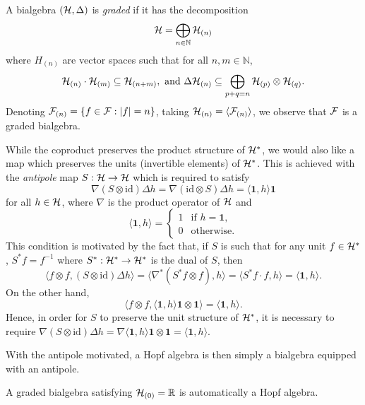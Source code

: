 \documentclass[11pt]{style/preprint}
\begin{document}
A bialgebra \(({\mathcal H}, \Delta)\) is \textit{graded} if it has the decomposition 
\[{\mathcal H} = \bigoplus_{n \in \mathbb{N}} {\mathcal H}_{(n)}\]
where \(H_{(n)}\) are vector spaces such that for all \(n, m \in \mathbb{N}\),
\[{\mathcal H}_{(n)} \cdot {\mathcal H}_{(m)} \subseteq {\mathcal H}_{(n + m)}, \text{ and } 
  \Delta {\mathcal H}_{(n)} \subseteq \bigoplus_{p + q = n} {\mathcal H}_{(p)} \otimes {\mathcal H}_{(q)}.\]
Denoting \({\mathcal F}_{(n)} = \{f \in {\mathcal F} : |f| = n\}\), taking \({\mathcal H}_{(n)} = \langle {\mathcal F}_{(n)}\rangle\), 
we observe that \({\mathcal F}\) is a graded bialgebra. 

While the coproduct preserves the product structure of \({\mathcal H}^*\), we would also like a map which 
preserves the units (invertible elements) of \({\mathcal H}^*\). This is achieved with the \textit{antipole} 
map \(S : {\mathcal H} \to {\mathcal H}\) which is required to satisfy
\begin{equation}\label{eq:antipole}
  \nabla (S \otimes \text{id}) \Delta h = \nabla (\text{id} \otimes S) \Delta h = \langle \mathbf{1}, h\rangle \mathbf{1}
\end{equation}
for all \(h \in {\mathcal H}\), where \(\nabla\) is the product operator of \({\mathcal H}\) and 
\[\langle\mathbf{1}, h\rangle = 
\begin{cases}
  1 & \text{if } h = \mathbf{1},\\
  0 & \text{otherwise}.
\end{cases}\]
This condition is motivated by the fact that, if \(S\) is such that for any unit \(f \in {\mathcal H}^*\), 
\(S^* f = f^{-1}\) where \(S^* : {\mathcal H}^* \to {\mathcal H}^*\) is the dual of \(S\), then
\[\langle f \otimes f, (S \otimes \text{id})\Delta h\rangle 
  = \langle \nabla^* (S^* f \otimes f), h\rangle = \langle S^* f \cdot f, h\rangle = \langle \mathbf{1}, h\rangle.\]
On the other hand, 
\[\langle f \otimes f, \langle \mathbf{1}, h\rangle \mathbf{1} \otimes \mathbf{1}\rangle = \langle \mathbf{1}, h\rangle.\]
Hence, in order for \(S\) to preserve the unit structure of \({\mathcal H}^*\), it is necessary to require
\(\nabla (S \otimes \text{id})\Delta h = \nabla \langle \mathbf{1}, h\rangle \mathbf{1} \otimes \mathbf{1} 
= \langle \mathbf{1}, h\rangle\). 

With the antipole motivated, a Hopf algebra is then simply a bialgebra equipped with an antipole.

\begin{proposition}
  A graded bialgebra satisfying \({\mathcal H}_{(0)} = \mathbb{R}\) is automatically a Hopf algebra.
\end{proposition}
\end{document}

